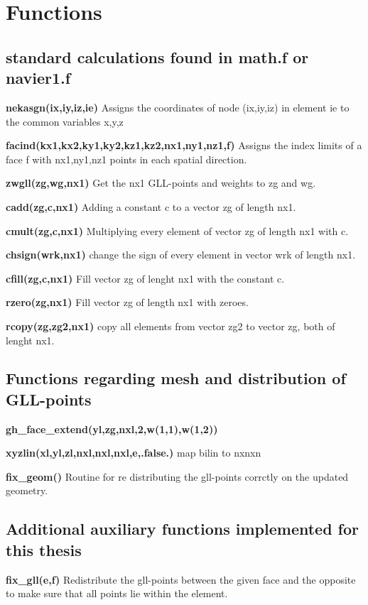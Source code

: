 \section{Functions}

\subsection{standard calculations found in math.f or navier1.f}

\textbf{nekasgn(ix,iy,iz,ie) } Assigns the coordinates of node 
    (ix,iy,iz) in element ie to the common variables x,y,z 

\textbf{facind(kx1,kx2,ky1,ky2,kz1,kz2,nx1,ny1,nz1,f) } 
Assigns the index limits of a face f with nx1,ny1,nz1 points in each spatial direction.

\textbf{zwgll(zg,wg,nx1)} Get the nx1 GLL-points and weights to zg and wg.

\textbf{cadd(zg,c,nx1)} Adding a constant c to a vector zg of length nx1.

\textbf{cmult(zg,c,nx1)} Multiplying every element of vector zg of length nx1 with c.

\textbf{chsign(wrk,nx1)} change the sign of every element in vector wrk of length nx1.

\textbf{cfill(zg,c,nx1)}  Fill vector zg of lenght nx1 with the constant c.

\textbf{rzero(zg,nx1) } Fill vector zg of length nx1 with zeroes.

\textbf{rcopy(zg,zg2,nx1) } copy all elements from vector zg2 to vector zg, both of lenght nx1.

\subsection{Functions regarding mesh and distribution of GLL-points}

\textbf{gh\_face\_extend(yl,zg,nxl,2,w(1,1),w(1,2))}  

\textbf{xyzlin(xl,yl,zl,nxl,nxl,nxl,e,.false.)} map bilin to nxnxn 

\textbf{fix\_geom()} Routine for re distributing the gll-points corrctly on the updated geometry.

\subsection{Additional auxiliary functions implemented for this thesis}

\textbf{fix\_gll(e,f)} Redistribute the gll-points between the given face and the opposite to make sure that all points lie within the element.

